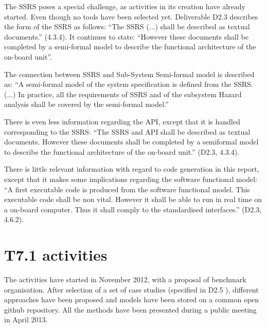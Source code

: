 The SSRS poses a special challenge, as activities in its creation have already started.  Even though no tools have been selected yet.  Deliverable D2.3 describes the form of the SSRS as follows:
``The SSRS (...) shall be described as textual documents.'' (4.3.4).  It continues to state: ``However these documents shall be completed by a semi-formal model to describe the functional architecture of the on-board unit''.

The connection between SSRS and Sub-System Semi-formal model is described as: ``A semi-formal model of the system specification is defined from the SSRS. (...) In practice, all the requirements of SSRS and of the subsystem Hazard analysis shall be covered by the semi-formal model.''

There is even less information regarding the API, except that it is handled corresponding to the SSRS: ``The SSRS and API shall be described as textual documents. However these documents shall be completed by a semiformal model to describe the functional architecture of the on-board unit.'' (D2.3, 4.3.4).

There is little relevant information with regard to code generation in this report, except that it makes some implications regarding the software functional model: ``A first executable code is produced from the software functional model.  This executable code shall be non vital. However it shall be able to run in real time on a on-board computer.  Thus it shall comply to the standardised interfaces.'' (D2.3, 4.6.2).



\section{T7.1 activities}

The activities have started in November 2012, with a proposal of benchmark organisation.
After selection of a set of case studies (specified in D2.5 \citep{D2_5}), different approaches have been proposed and models have been stored on a common open github repository.
All the methods have been presented during a public meeting in April 2013.

